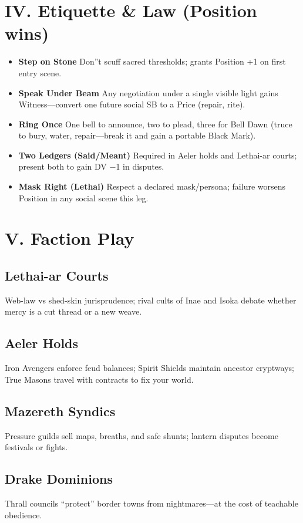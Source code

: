 \documentclass[11pt]{article}
\begin{document}
\section{IV. Etiquette \& Law (Position wins)}
\begin{itemize}
    \item \textbf{Step on Stone} Don''t scuff sacred thresholds; grants Position +1 on first entry scene.
    \item \textbf{Speak Under Beam} Any negotiation under a single visible light gains Witness---convert one future social SB to a Price (repair, rite).
    \item \textbf{Ring Once} One bell to announce, two to plead, three for Bell Dawn (truce to bury, water, repair---break it and gain a portable Black Mark).
    \item \textbf{Two Ledgers (Said/Meant)} Required in Aeler holds and Lethai-ar courts; present both to gain DV −1 in disputes.
    \item \textbf{Mask Right (Lethai)} Respect a declared mask/persona; failure worsens Position in any social scene this leg.
\end{itemize}

\section{V. Faction Play}

\subsection{Lethai-ar Courts} Web-law vs shed-skin jurisprudence; rival cults of Inae and Isoka debate whether mercy is a cut thread or a new weave.

\subsection{Aeler Holds} Iron Avengers enforce feud balances; Spirit Shields maintain ancestor cryptways; True Masons travel with contracts to fix your world.

\subsection{Mazereth Syndics} Pressure guilds sell maps, breaths, and safe shunts; lantern disputes become festivals or fights.

\subsection{Drake Dominions} Thrall councils ``protect'' border towns from nightmares---at the cost of teachable obedience.
\end{document}
